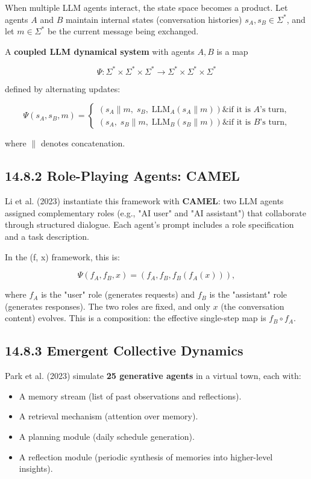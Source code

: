 When multiple LLM agents interact, the state space becomes a product. Let agents $A$ and $B$ maintain internal states (conversation histories) $s_A, s_B \in \Sigma^*$, and let $m \in \Sigma^*$ be the current message being exchanged.

\begin{definition}
A \textbf{coupled LLM dynamical system} with agents $A, B$ is a map

\[\Psi: \Sigma^* \times \Sigma^* \times \Sigma^* \to \Sigma^* \times \Sigma^* \times \Sigma^*\]

defined by alternating updates:

\[\Psi(s_A, s_B, m) = \begin{cases} (s_A \| m, \; s_B, \; \mathrm{LLM}_A(s_A \| m)) \& \text{if it is } A\text{'s turn,} \\ (s_A, \; s_B \| m, \; \mathrm{LLM}_B(s_B \| m)) \& \text{if it is } B\text{'s turn,} \end{cases}\]

where $\|$ denotes concatenation.
\end{definition}

\subsection{14.8.2 Role-Playing Agents: CAMEL}

Li et al. (2023) instantiate this framework with \textbf{CAMEL}: two LLM agents assigned complementary roles (e.g., "AI user" and "AI assistant") that collaborate through structured dialogue. Each agent's prompt includes a role specification and a task description.

In the (f, x) framework, this is:

\[\Psi(f_A, f_B, x) = (f_A, f_B, f_B(f_A(x))),\]

where $f_A$ is the "user" role (generates requests) and $f_B$ is the "assistant" role (generates responses). The two roles are fixed, and only $x$ (the conversation content) evolves. This is a composition: the effective single-step map is $f_B \circ f_A$.

\subsection{14.8.3 Emergent Collective Dynamics}

Park et al. (2023) simulate \textbf{25 generative agents} in a virtual town, each with:
\begin{itemize}
\item A memory stream (list of past observations and reflections).
\item A retrieval mechanism (attention over memory).
\item A planning module (daily schedule generation).
\item A reflection module (periodic synthesis of memories into higher-level insights).
\end{itemize}


